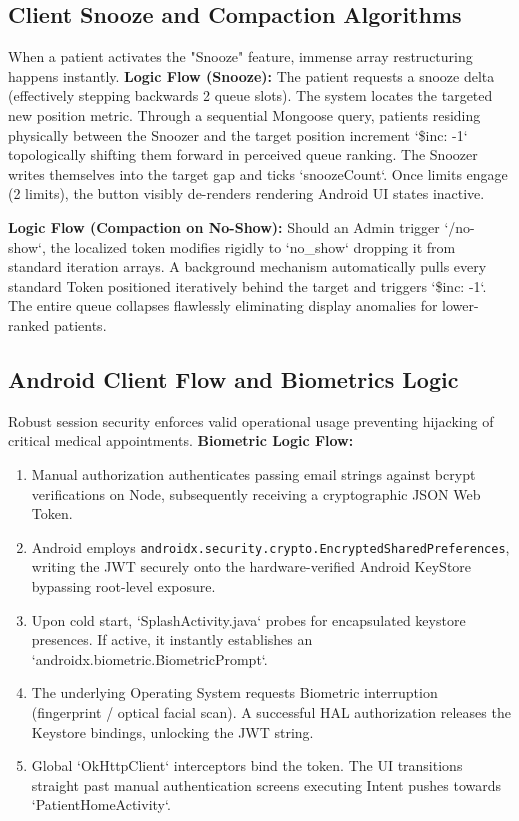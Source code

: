 \documentclass[12pt,a4paper]{article}
\begin{document}
\subsection{Client Snooze and Compaction Algorithms}

When a patient activates the "Snooze" feature, immense array restructuring happens instantly.
\textbf{Logic Flow (Snooze):}
The patient requests a snooze delta (effectively stepping backwards 2 queue slots). The system locates the targeted new position metric. Through a sequential Mongoose query, patients residing physically between the Snoozer and the target position increment `\$inc: -1` topologically shifting them forward in perceived queue ranking. The Snoozer writes themselves into the target gap and ticks `snoozeCount`. Once limits engage (2 limits), the button visibly de-renders rendering Android UI states inactive.

\textbf{Logic Flow (Compaction on No-Show):}
Should an Admin trigger `/no-show`, the localized token modifies rigidly to `no_show` dropping it from standard iteration arrays. A background mechanism automatically pulls every standard Token positioned iteratively behind the target and triggers `\$inc: -1`. The entire queue collapses flawlessly eliminating display anomalies for lower-ranked patients.

\subsection{Android Client Flow and Biometrics Logic}

Robust session security enforces valid operational usage preventing hijacking of critical medical appointments.
\textbf{Biometric Logic Flow:}
\begin{enumerate}
    \item Manual authorization authenticates passing email strings against bcrypt verifications on Node, subsequently receiving a cryptographic JSON Web Token.
    \item Android employs \texttt{androidx.security.crypto.EncryptedSharedPreferences}, writing the JWT securely onto the hardware-verified Android KeyStore bypassing root-level exposure.
    \item Upon cold start, `SplashActivity.java` probes for encapsulated keystore presences. If active, it instantly establishes an `androidx.biometric.BiometricPrompt`.
    \item The underlying Operating System requests Biometric interruption (fingerprint / optical facial scan). A successful HAL authorization releases the Keystore bindings, unlocking the JWT string.
    \item Global `OkHttpClient` interceptors bind the token. The UI transitions straight past manual authentication screens executing Intent pushes towards `PatientHomeActivity`.
\end{enumerate}
\end{document}
